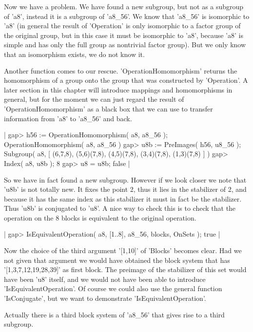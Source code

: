Now  we have  a problem.   We  have found a  new  subgroup, but not  as a
subgroup of 'a8', instead  it  is a subgroup of 'a8\_56'.   We  know that
'a8\_56' is isomorphic to 'a8' (in  general the  result of 'Operation' is
only isomorphic to a factor group of the original group, but in this case
it must be  isomorphic to 'a8', because 'a8'  is  simple and has only the
full  group as  nontrivial  factor group).   But we  only  know  that  an
isomorphism exists, we do not know it.

Another  function comes  to our rescue.  'OperationHomomorphism'  returns
the  homomorphism of a  group  onto  the group  that  was  constructed by
'Operation'.  A later section in this chapter will introduce mappings and
homomorphisms  in  general,  but  for the  moment we  can just regard the
result  of 'OperationHomomorphism' as  a  black box that  we can  use  to
transfer information from 'a8' to 'a8\_56' and back.

|    gap> h56 := OperationHomomorphism( a8, a8_56 );
    OperationHomomorphism( a8, a8_56 )
    gap> u8b := PreImages( h56, u8_56 );
    Subgroup( a8, [ (6,7,8), (5,6)(7,8), (4,5)(7,8), (3,4)(7,8),
      (1,3)(7,8) ] )
    gap> Index( a8, u8b );
    8
    gap> u8 = u8b;
    false |

So we have  in fact found a new subgroup.   However if we  look closer we
note that 'u8b' is not  totally new.  It fixes  the point 2, thus it lies
in  the  stabilizer of  2, and because  it  has the  same  index  as this
stabilizer it must in fact be the stabilizer.  Thus  'u8b' is  conjugated
to 'u8'.  A nice way to check  this is to check that the operation on the
8 blocks is equivalent to the original operation.

|    gap> IsEquivalentOperation( a8, [1..8], a8_56, blocks, OnSets );
    true |

Now the choice of the third  argument '[1,10]' of 'Blocks' becomes clear.
Had  we not  given that argument  we would have obtained the block system
that  has  '[1,3,7,12,19,28,39]' as first  block.   The  preimage of  the
stabilizer of this set would have been 'u8' itself, and we would not have
been able to  introduce 'IsEquivalentOperation'.  Of course we could also
use the  general  function  'IsConjugate',  but  we  want  to demonstrate
'IsEquivalentOperation'.

Actually there  is a  third block system of 'a8\_56' that gives rise to a
third subgroup.

